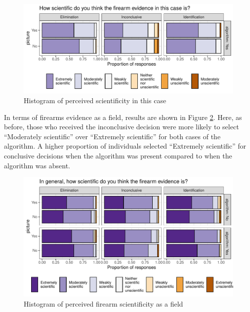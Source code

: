 \documentclass[print]{nuthesis}
\begin{document}
\begin{figure}

{\centering \includegraphics[width=\linewidth]{thesis_files/figure-latex/casesci-1} 

}

\caption{Histogram of perceived scientificity in this case}\label{fig:casesci}
\end{figure}

In terms of firearms evidence as a field, results are shown in Figure \ref{fig:gensci}.
Here, as before, those who received the inconclusive decision were more likely to select ``Moderately scientific'' over ``Extremely scientific'' for both cases of the algorithm.
A higher proportion of individuals selected ``Extremely scientific'' for conclusive decisions when the algorithm was present compared to when the algorithm was absent.

\begin{figure}

{\centering \includegraphics[width=\linewidth]{thesis_files/figure-latex/gensci-1} 

}

\caption{Histogram of perceived firearm scientificity as a field}\label{fig:gensci}
\end{figure}
\end{document}
